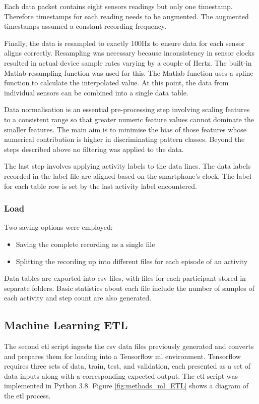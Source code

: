 Each data packet contains eight sensors readings but only one timestamp. Therefore timestamps for each reading needs to be augmented. The augmented timestamps assumed a constant recording frequency.

Finally, the data is resampled to exactly 100Hz to ensure data for each sensor aligns correctly. Resampling was necessary because inconsistency in sensor clocks resulted in actual device sample rates varying by a couple of Hertz. The built-in Matlab resampling function was used for this. The Matlab function uses a spline function to calculate the interpolated value. At this point, the data from individual sensors can be combined into a single data table.

Data normalisation is an essential pre-processing step involving scaling features to a consistent range so that greater numeric feature values cannot dominate the smaller features\cite{Singh2020}. The main aim is to minimise the bias of those features whose numerical contribution is higher in discriminating pattern classes. Beyond the steps described above no filtering was applied to the data.

The last step involves applying activity labels to the data lines. The data labels recorded in the label file are aligned based on the smartphone's clock. The label for each table row is set by the last activity label encountered.

\subsubsection{Load}
Two saving options were employed:
\begin{itemize}
    \item Saving the complete recording as a single file
    \item Splitting the recording up into different files for each episode of an activity
\end{itemize}

Data tables are exported into \acrshort{csv} files, with files for each participant stored in separate folders. Basic statistics about each file include the number of samples of each activity and step count are also generated.

\subsection{Machine Learning ETL}
\label{subsec:ML-ETL}
The second \acrshort{etl} script ingests the \acrshort{csv} data files previously generated and converts and prepares them for loading into a Tensorflow \acrshort{ml} environment. Tensorflow requires three sets of data, train, test, and validation, each presented as a set of data inputs along with a corresponding expected output. The \acrshort{etl} script was implemented in Python 3.8. Figure \ref{fig:methods_ml_ETL} shows a diagram of the \acrshort{etl} process.

